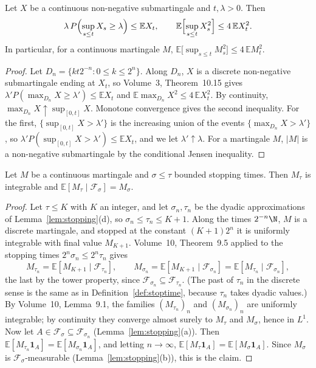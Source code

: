 \begin{theorem}\label{thm:doobcont}
Let $X$ be a continuous non-negative submartingale and $t,\lambda>0$. Then
\[
\lambda\,P\Bigl(\sup_{s\le t}X_s\ge\lambda\Bigr)\le\mathbb EX_t,\qquad\mathbb E\Bigl[\sup_{s\le t}X_s^2\Bigr]\le4\,\mathbb E X_t^2.
\]
In particular, for a continuous martingale $M$, $\mathbb E\bigl[\sup_{s\le t}M_s^2\bigr]\le4\,\mathbb EM_t^2$.
\end{theorem}

\begin{proof}
Let $D_n=\{kt2^{-n}:0\le k\le2^n\}$. Along $D_n$, $X$ is a discrete non-negative submartingale ending at $X_t$, so Volume~3, Theorem~10.15 gives $\lambda'P(\max_{D_n}X\ge\lambda')\le\mathbb EX_t$ and
$\mathbb E\max_{D_n}X^2\le4\,\mathbb EX_t^2$. By continuity, $\max_{D_n}X\uparrow\sup_{[0,t]}X$. Monotone convergence gives the second inequality. For the first, $\{\sup_{[0,t]}X>\lambda'\}$ is the increasing union of
the events $\{\max_{D_n}X>\lambda'\}$, so $\lambda'P(\sup_{[0,t]}X>\lambda')\le\mathbb EX_t$, and we let $\lambda'\uparrow\lambda$. For a martingale $M$, $|M|$ is a non-negative submartingale by the conditional Jensen
inequality.
\end{proof}

\begin{theorem}\label{thm:ostcont}
Let $M$ be a continuous martingale and $\sigma\le\tau$ bounded stopping times. Then $M_\tau$ is integrable and $\mathbb E[M_\tau\mid\mathcal F_\sigma]=M_\sigma$.
\end{theorem}

\begin{proof}
Let $\tau\le K$ with $K$ an integer, and let $\sigma_n,\tau_n$ be the dyadic approximations of Lemma~\ref{lem:stopping}(d), so $\sigma_n\le\tau_n\le K+1$. Along the times $2^{-n}\N$, $M$ is a discrete martingale, and
stopped at the constant $(K+1)2^{n}$ it is uniformly integrable with final value $M_{K+1}$. Volume~10, Theorem~9.5 applied to the stopping times $2^n\sigma_n\le2^n\tau_n$ gives
\[
M_{\tau_n}=\mathbb E[M_{K+1}\mid\mathcal F_{\tau_n}],\qquad M_{\sigma_n}=\mathbb E[M_{K+1}\mid\mathcal F_{\sigma_n}]=\mathbb E[M_{\tau_n}\mid\mathcal F_{\sigma_n}],
\]
the last by the tower property, since $\mathcal F_{\sigma_n}\subseteq\mathcal F_{\tau_n}$. (The past of $\tau_n$ in the discrete sense is the same as in Definition~\ref{def:stoptime}, because $\tau_n$ takes
dyadic values.) By Volume~10, Lemma~9.1, the families $(M_{\tau_n})_n$ and $(M_{\sigma_n})_n$ are uniformly integrable; by continuity they converge almost surely to $M_\tau$ and $M_\sigma$, hence in $L^1$. Now let
$A\in\mathcal F_\sigma\subseteq\mathcal F_{\sigma_n}$ (Lemma~\ref{lem:stopping}(a)). Then $\mathbb E[M_{\tau_n}\mathbf 1_A]=\mathbb E[M_{\sigma_n}\mathbf 1_A]$, and letting $n\to\infty$,
$\mathbb E[M_\tau\mathbf 1_A]=\mathbb E[M_\sigma\mathbf 1_A]$. Since $M_\sigma$ is $\mathcal F_\sigma$-measurable (Lemma~\ref{lem:stopping}(b)), this is the claim.
\end{proof}

